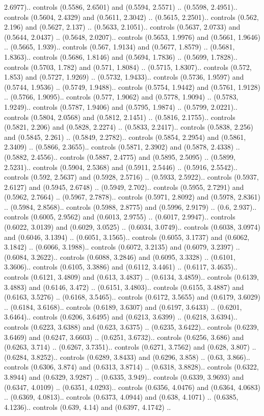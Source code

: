2.6977).. controls (0.5586, 2.6501) and (0.5594, 2.5571) .. (0.5598, 2.4951).. controls (0.5604, 2.4329) and (0.5611, 2.3042) .. (0.5615, 2.2501).. controls (0.562, 2.196) and (0.5627, 2.137) .. (0.5633, 2.1051).. controls (0.5637, 2.0733) and (0.5644, 2.0437) .. (0.5648, 2.0207).. controls (0.5653, 1.9976) and (0.5661, 1.9646) .. (0.5665, 1.939).. controls (0.567, 1.9134) and (0.5677, 1.8579) .. (0.5681, 1.8363).. controls (0.5686, 1.8146) and (0.5694, 1.7836) .. (0.5699, 1.7828).. controls (0.5703, 1.782) and (0.571, 1.8084) .. (0.5715, 1.8307).. controls (0.572, 1.853) and (0.5727, 1.9269) .. (0.5732, 1.9433).. controls (0.5736, 1.9597) and (0.5744, 1.9536) .. (0.5749, 1.9488).. controls (0.5754, 1.9442) and (0.5761, 1.9128) .. (0.5766, 1.9095).. controls (0.577, 1.9062) and (0.5778, 1.9094) .. (0.5783, 1.9249).. controls (0.5787, 1.9406) and (0.5795, 1.9874) .. (0.5799, 2.0221).. controls (0.5804, 2.0568) and (0.5812, 2.1451) .. (0.5816, 2.1755).. controls (0.5821, 2.206) and (0.5828, 2.2274) .. (0.5833, 2.2417).. controls (0.5838, 2.256) and (0.5845, 2.261) .. (0.5849, 2.2782).. controls (0.5854, 2.2954) and (0.5861, 2.3409) .. (0.5866, 2.3655).. controls (0.5871, 2.3902) and (0.5878, 2.4338) .. (0.5882, 2.4556).. controls (0.5887, 2.4775) and (0.5895, 2.5095) .. (0.5899, 2.5231).. controls (0.5904, 2.5368) and (0.5911, 2.5446) .. (0.5916, 2.5542).. controls (0.592, 2.5637) and (0.5928, 2.5716) .. (0.5933, 2.5922).. controls (0.5937, 2.6127) and (0.5945, 2.6748) .. (0.5949, 2.702).. controls (0.5955, 2.7291) and (0.5962, 2.7664) .. (0.5967, 2.7878).. controls (0.5971, 2.8092) and (0.5978, 2.8361) .. (0.5984, 2.8568).. controls (0.5988, 2.8775) and (0.5996, 2.9179) .. (0.6, 2.937).. controls (0.6005, 2.9562) and (0.6013, 2.9755) .. (0.6017, 2.9947).. controls (0.6022, 3.0139) and (0.6029, 3.0525) .. (0.6034, 3.0749).. controls (0.6038, 3.0974) and (0.6046, 3.1394) .. (0.6051, 3.1565).. controls (0.6055, 3.1737) and (0.6062, 3.1842) .. (0.6066, 3.1988).. controls (0.6072, 3.2135) and (0.6079, 3.2397) .. (0.6084, 3.2622).. controls (0.6088, 3.2846) and (0.6095, 3.3328) .. (0.6101, 3.3606).. controls (0.6105, 3.3886) and (0.6112, 3.4461) .. (0.6117, 3.4635).. controls (0.6121, 3.4809) and (0.613, 3.4837) .. (0.6134, 3.4859).. controls (0.6139, 3.4883) and (0.6146, 3.472) .. (0.6151, 3.4803).. controls (0.6155, 3.4887) and (0.6163, 3.5276) .. (0.6168, 3.5465).. controls (0.6172, 3.5655) and (0.6179, 3.6029) .. (0.6184, 3.6168).. controls (0.6189, 3.6307) and (0.6197, 3.6433) .. (0.6201, 3.6464).. controls (0.6206, 3.6495) and (0.6213, 3.6399) .. (0.6218, 3.6394).. controls (0.6223, 3.6388) and (0.623, 3.6375) .. (0.6235, 3.6422).. controls (0.6239, 3.6469) and (0.6247, 3.6603) .. (0.6251, 3.6732).. controls (0.6256, 3.686) and (0.6263, 3.714) .. (0.6267, 3.7351).. controls (0.6271, 3.7562) and (0.628, 3.807) .. (0.6284, 3.8252).. controls (0.6289, 3.8433) and (0.6296, 3.858) .. (0.63, 3.866).. controls (0.6306, 3.874) and (0.6313, 3.8714) .. (0.6318, 3.8828).. controls (0.6322, 3.8944) and (0.6329, 3.9287) .. (0.6335, 3.949).. controls (0.6339, 3.9693) and (0.6347, 4.0109) .. (0.6351, 4.0293).. controls (0.6356, 4.0476) and (0.6364, 4.0683) .. (0.6369, 4.0813).. controls (0.6373, 4.0944) and (0.638, 4.1071) .. (0.6385, 4.1236).. controls (0.639, 4.14) and (0.6397, 4.1742) .. 